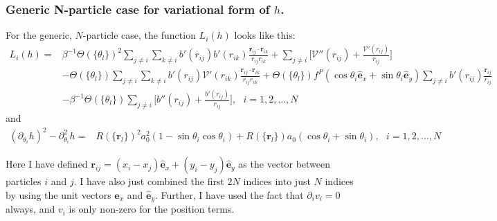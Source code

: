 \documentclass{article}
\begin{document}
\subsubsection{Generic N-particle case for variational form of $h$.}
For the generic, $N$-particle case, the function $L_i(h)$ looks like this:
\begin{align}\label{eq:genericNpartD_t}
  L_i(h) =& \beta^{-1}\Theta(\{\theta_l\})^2\sum_{j\neq i}\sum_{k\neq i} b'(r_{ij})b'(r_{ik})
            \frac{\bm{r}_{ij}\cdot\bm{r}_{ik}}{r_{ij}r_{ik}}
            + \sum_{j\neq i}\bigg[\mathcal{V}''(r_{ij})
            +\frac{\mathcal{V}'(r_{ij})}{r_{ij}}\bigg]\nonumber\\
          & - \Theta(\{\theta_l\})\sum_{j\neq i}\sum_{k\neq i}b'(r_{ij})\mathcal{V}'(r_{ik})
            \frac{\bm{r}_{ij}\cdot\bm{r}_{ik}}{r_{ij}r_{ik}}
            +\Theta(\{\theta_l\})f^P(\cos\theta_i\hat{\bm{e}}_x+\sin\theta_i\hat{\bm{e}}_y)
            \sum_{j\neq i}b'(r_{ij})
            \frac{\bm{r}_{ij}}{r_{ij}}\nonumber\\
          & - \beta^{-1}\Theta(\{\theta_l\})\sum_{j\neq i}\bigg[b''(r_{ij})
            +\frac{b'(r_{ij})}{r_{ij}}\bigg],\:\:\: i = 1,2,...,N
\end{align}
and
\begin{align}\label{eq:genericNpartD_r}
  (\partial_{\theta_i}h)^2-\partial_{\theta_i}^2h
  =&R(\{\bm{r}_l\})^2a_0^2(1-\sin\theta_i\cos\theta_i)
     +R(\{\bm{r}_l\})a_0(\cos\theta_i+\sin\theta_i),\:\:\: i = 1,2,...,N
\end{align}
            
Here I have defined $\bm{r}_{ij}=(x_i-x_j)\hat{\bm{e}}_x+(y_i-y_j)\hat{\bm{e}}_y$ as the vector
between particles $i$ and $j$. I have also just combined the first $2N$ indices into just $N$
indices by using the unit vectors $\hat{\bm{e}}_x$ and $\hat{\bm{e}}_y$. Further, I have used the
fact that $\partial_i v_i=0$ always, and $v_i$ is only non-zero for the position terms.
\end{document}
